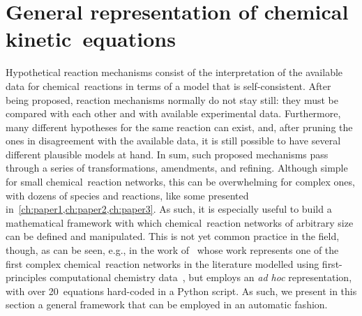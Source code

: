 \section{General representation of chemical kinetic~equations}%
\label{sec:kin-repr}

Hypothetical reaction mechanisms consist of the interpretation of the available data for chemical~reactions in terms of a model that is self-consistent.
After being proposed,
reaction mechanisms normally do not stay still: they must be compared with each other and with available experimental data.
Furthermore,
many different hypotheses for the same reaction can exist,
and,
after pruning the ones in disagreement with the available data,
it is still possible to have several different plausible models at hand.
In sum,
such proposed mechanisms pass through a series of transformations,
amendments,
and refining.
Although simple for small chemical~reaction networks,
this can be overwhelming for complex ones,
with dozens of species and reactions,
like some presented in~\cref{ch:paper1,ch:paper2,ch:paper3}.
As such,
it is especially useful to build a mathematical framework with which chemical~reaction networks of arbitrary size can be defined and manipulated.
This is not yet common practice in the field,
though,
as can be seen,
e.g.,
in the work of~\citeauthor{P_rez_Soto_2020} whose work represents one of the first complex chemical~reaction networks in the literature modelled using first-principles computational chemistry data~\cite{P_rez_Soto_2020},
but employs an \emph{ad hoc} representation,
with over 20~equations hard-coded in a Python script.
As such,
we present in this section a general framework that can be employed in an automatic fashion.

